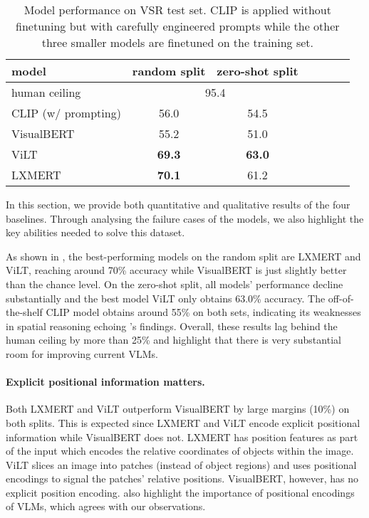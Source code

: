 \begin{table}[ht]
\centering
\small
\begin{tabular}{lcccccc}
\toprule
model & random split & zero-shot split \\
\midrule
human ceiling & \multicolumn{2}{c}{95.4}   \\
\midrule
CLIP {\scriptsize(w/ prompting)} & 56.0 & 54.5 \\
\midrule
VisualBERT &  55.2 & 51.0  \\ 
ViLT & \textbf{69.3} &  \textbf{63.0}  \\ 
LXMERT & \textbf{70.1} & 61.2  \\ 
\bottomrule
\end{tabular}
\caption{Model performance on VSR test set. CLIP is applied without finetuning but with carefully engineered prompts while the other three smaller models are finetuned on the training set.}
\label{table:results}
\end{table}

In this section, we provide both quantitative and qualitative results of the four baselines. Through analysing the failure cases of the models, we also highlight the key abilities needed to solve this dataset.

As shown in , the best-performing models on the random split are LXMERT and ViLT, reaching around 70\% accuracy while VisualBERT is just slightly better than the chance level. On the zero-shot split, all models' performance decline substantially and the best model ViLT only obtains 63.0\% accuracy.
The off-of-the-shelf CLIP model obtains around 55\% on both sets, indicating its weaknesses in spatial reasoning echoing \citet{subramanian2022reclip}'s findings.
Overall, these results lag behind the human ceiling by more than 25\% and highlight that there is very substantial room for improving current VLMs. 

\paragraph{Explicit positional information matters.} Both LXMERT and ViLT outperform VisualBERT by large margins (10\%) on both splits.
This is expected since LXMERT and ViLT encode explicit positional information while VisualBERT does not. LXMERT has position features as part of the input which encodes the relative coordinates of objects within the image. ViLT slices an image into patches (instead of object regions) and uses positional encodings to signal the patches' relative positions.
VisualBERT, however, has no explicit position encoding. \citet{bugliarello-etal-2021-multimodal,positional2022} also highlight the importance of positional encodings of VLMs, which agrees with our observations.

